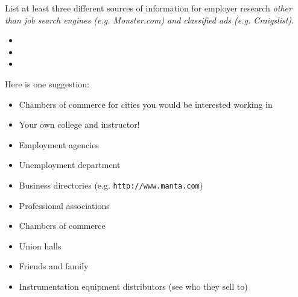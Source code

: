 

List at least three different sources of information for employer research {\it other than job search engines (e.g. Monster.com) and classified ads (e.g. Craigslist)}.

\begin{itemize}
\item{} 
\vskip 30pt
\item{} 
\vskip 30pt
\item{} 
\end{itemize}

\vfil

\eject






Here is one suggestion:

\begin{itemize}
\item{} Chambers of commerce for cities you would be interested working in
\end{itemize}







\begin{itemize}
\item{} Your own college and instructor!
\item{} Employment agencies
\item{} Unemployment department
\item{} Business directories (e.g. {\tt http://www.manta.com})
\item{} Professional associations
\item{} Chambers of commerce
\item{} Union halls
\item{} Friends and family
\item{} Instrumentation equipment distributors (see who they sell to)
\end{itemize}




